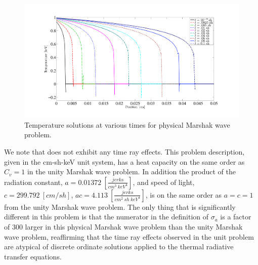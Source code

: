 \begin{figure}[!hbp]
\centering
\includegraphics[width=16cm,trim=2in  0.4in 0.5in 0.75in,clip=true]{chapter6_grey_radtran/Dissertation_Data/100C_Physical_Marshak_Wave_Temperature_Times.pdf}
\caption{Temperature solutions at various times for physical Marshak wave problem.}
\label{fig:physical_slices_temperature}
\end{figure}
We note that  does not exhibit any time ray effects.  
This problem description, given in the cm-sh-keV unit system, has a heat capacity on the same order as $C_v=1$ in the unity Marshak wave problem.  
In addition the product of the radiation constant, $a = 0.01372~[\frac{jerks}{cm^3~keV^4}]$, and speed of light, $c=299.792~[cm/sh]$, $ac = 4.113~\left[\frac{jerks}{cm^2~sh~keV^4}\right]$, is on the same order as $a=c=1$ from the unity Marshak wave problem.
The only thing that is significantly different in this problem is that the numerator in the definition of $\sigma_a$ is a factor of 300 larger in this physical Marshak wave problem than the unity Marshak wave problem, reaffirming that the time ray effects observed in the unit problem are atypical of discrete ordinate solutions applied to the thermal radiative transfer equations.


